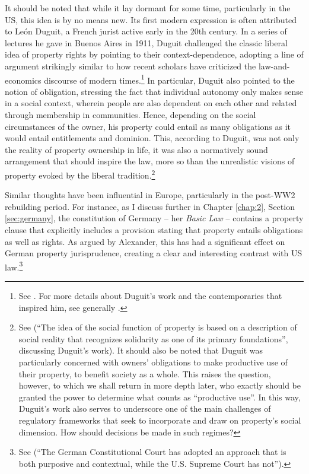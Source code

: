 It should be noted that while it lay dormant for some time, particularly in the US, this idea is by no means new. Its first modern expression is often attributed to Le{\'o}n Duguit, a French jurist active early in the 20th century. In a series of lectures he gave in Buenos Aires in 1911, Duguit challenged the classic liberal idea of property rights by pointing to their context-dependence, adopting a line of argument strikingly similar to how recent scholars have criticized the law-and-economics discourse of modern times.\footnote{See \cite[1004-1008]{foster11}. For more details about Duguit's work and the contemporaries that inspired him, see generally \cite{mirow10}.} In particular, Duguit also pointed to the notion of obligation, stressing the fact that individual autonomy only makes sense in a social context, wherein people are also dependent on each other and related through membership in communities. Hence, depending on the social circumstances of the owner, his property could entail as many obligations as it would entail entitlements and dominion. This, according to Duguit, was not only the reality of property ownership in life, it was also a normatively sound arrangement that should inspire the law, more so than the unrealistic visions of property evoked by the liberal tradition.\footnote{See \cite[1005]{foster11} (``The idea of the social function of property is based on a description of social reality that recognizes solidarity as one of its primary foundations'', discussing Duguit's work). It should also be noted that Duguit was particularly concerned with owners' obligations to make productive use of their property, to benefit society as a whole. This raises the question, however, to which we shall return in more depth later, who exactly should be granted the power to determine what counts as ``productive use''. In this way, Duguit's work also serves to underscore one of the main challenges of regulatory frameworks that seek to incorporate and draw on property's social dimension. How should decisions be made in such regimes?} 

Similar thoughts have been influential in Europe, particularly in the post-WW2 rebuilding period. For instance, as I discuss further in Chapter \ref{chap:2}, Section \ref{sec:germany}, the constitution of Germany -- her {\it Basic Law} -- contains a property clause that explicitly includes a provision stating that property entails obligations as well as rights. As argued by Alexander, this has had a significant effect on German property jurisprudence, creating a clear and interesting contrast with US law.\footnote{See \cite[338]{alexander03} (``The German Constitutional Court has adopted an approach that is both purposive and contextual, while the U.S. Supreme Court has not'').} 

